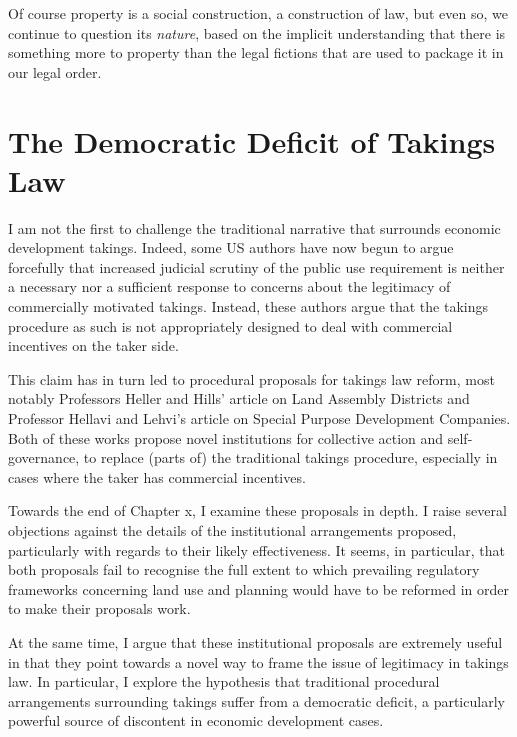 {Of course property is a social construction, a construction of law, but even so, we continue to question its {\it nature}, based on the implicit understanding that there is something more to property than the legal fictions that are used to package it in our legal order.
}

\section{The Democratic Deficit of Takings Law}

I am not the first to challenge the traditional narrative that surrounds economic development takings. Indeed, some US authors have now begun to argue forcefully that increased judicial scrutiny of the public use requirement is neither a necessary nor a sufficient response to concerns about the legitimacy of commercially motivated takings. Instead, these authors argue that the takings procedure as such is not appropriately designed to deal with commercial incentives on the taker side.

This claim has in turn led to procedural proposals for takings law reform, most notably Professors Heller and Hills' article on Land Assembly Districts and Professor Hellavi and Lehvi's article on Special Purpose Development Companies. Both of these works propose novel institutions for collective action and self-governance, to replace (parts of) the traditional takings procedure, especially in cases where the taker has commercial incentives. 

Towards the end of Chapter x, I examine these proposals in depth. I raise several objections against the details of the institutional arrangements proposed, particularly with regards to their likely effectiveness. It seems, in particular, that both proposals fail to recognise the full extent to which prevailing regulatory frameworks concerning land use and planning would have to be reformed in order to make their proposals work.

At the same time, I argue that these institutional proposals are extremely useful in that they point towards a novel way to frame the issue of legitimacy in takings law. In particular, I explore the hypothesis that traditional procedural arrangements surrounding takings suffer from a democratic deficit, a particularly powerful source of discontent in economic development cases.

